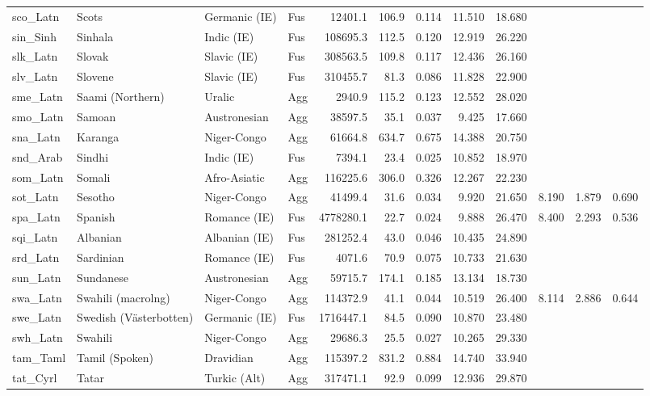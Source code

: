 \begin{tabular}{ll l l rr rr r rr r}
sco\_Latn & Scots & Germanic (IE) & Fus & 12401.1 & 106.9 & 0.114 & 11.510 & 18.680 &  &  &  \\
sin\_Sinh & Sinhala & Indic (IE) & Fus & 108695.3 & 112.5 & 0.120 & 12.919 & 26.220 &  &  &  \\
slk\_Latn & Slovak & Slavic (IE) & Fus & 308563.5 & 109.8 & 0.117 & 12.436 & 26.160 &  &  &  \\
slv\_Latn & Slovene & Slavic (IE) & Fus & 310455.7 & 81.3 & 0.086 & 11.828 & 22.900 &  &  &  \\
sme\_Latn & Saami (Northern) & Uralic & Agg & 2940.9 & 115.2 & 0.123 & 12.552 & 28.020 &  &  &  \\
smo\_Latn & Samoan & Austronesian & Agg & 38597.5 & 35.1 & 0.037 & 9.425 & 17.660 &  &  &  \\
sna\_Latn & Karanga & Niger-Congo & Agg & 61664.8 & 634.7 & 0.675 & 14.388 & 20.750 &  &  &  \\
snd\_Arab & Sindhi & Indic (IE) & Fus & 7394.1 & 23.4 & 0.025 & 10.852 & 18.970 &  &  &  \\
som\_Latn & Somali & Afro-Asiatic & Agg & 116225.6 & 306.0 & 0.326 & 12.267 & 22.230 &  &  &  \\
sot\_Latn & Sesotho & Niger-Congo & Agg & 41499.4 & 31.6 & 0.034 & 9.920 & 21.650 & 8.190 & 1.879 & 0.690 \\
spa\_Latn & Spanish & Romance (IE) & Fus & 4778280.1 & 22.7 & 0.024 & 9.888 & 26.470 & 8.400 & 2.293 & 0.536 \\
sqi\_Latn & Albanian & Albanian (IE) & Fus & 281252.4 & 43.0 & 0.046 & 10.435 & 24.890 &  &  &  \\
srd\_Latn & Sardinian & Romance (IE) & Fus & 4071.6 & 70.9 & 0.075 & 10.733 & 21.630 &  &  &  \\
sun\_Latn & Sundanese & Austronesian & Agg & 59715.7 & 174.1 & 0.185 & 13.134 & 18.730 &  &  &  \\
swa\_Latn & Swahili (macrolng) & Niger-Congo & Agg & 114372.9 & 41.1 & 0.044 & 10.519 & 26.400 & 8.114 & 2.886 & 0.644 \\
swe\_Latn & Swedish (Västerbotten) & Germanic (IE) & Fus & 1716447.1 & 84.5 & 0.090 & 10.870 & 23.480 &  &  &  \\
swh\_Latn & Swahili & Niger-Congo & Agg & 29686.3 & 25.5 & 0.027 & 10.265 & 29.330 &  &  &  \\
tam\_Taml & Tamil (Spoken) & Dravidian & Agg & 115397.2 & 831.2 & 0.884 & 14.740 & 33.940 &  &  &  \\
tat\_Cyrl & Tatar & Turkic (Alt) & Agg & 317471.1 & 92.9 & 0.099 & 12.936 & 29.870 &  &  &  \\

\end{tabular}
